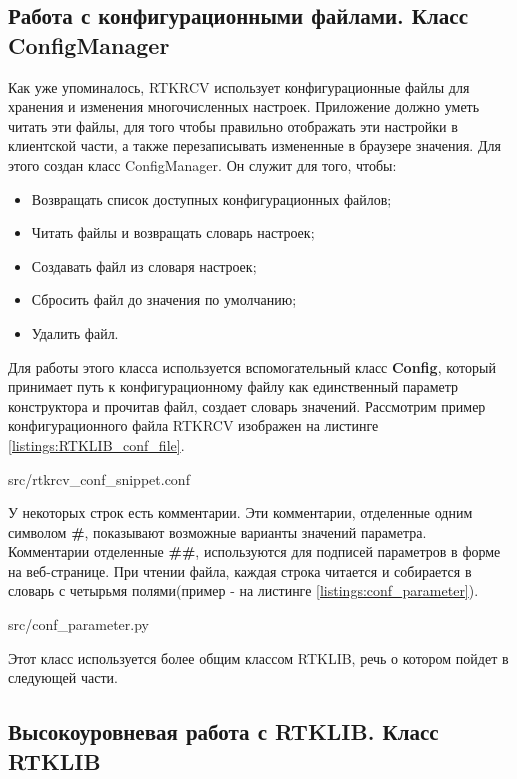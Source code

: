 \subsection{Работа с конфигурационными файлами. Класс ConfigManager} \label{subsect3_1_2}

Как уже упоминалось, RTKRCV использует конфигурационные файлы для хранения и изменения многочисленных настроек. Приложение должно уметь читать эти файлы, для того чтобы правильно отображать эти настройки в клиентской части, а также перезаписывать измененные в браузере значения. Для этого создан класс ConfigManager. Он служит для того, чтобы:

\begin{itemize}
  \item Возвращать список доступных конфигурационных файлов;
  \item Читать файлы и возвращать словарь настроек;
  \item Создавать файл из словаря настроек;
  \item Сбросить файл до значения по умолчанию;
  \item Удалить файл.
\end{itemize}

Для работы этого класса используется вспомогательный класс \textbf{Config}, который принимает путь к конфигурационному файлу как единственный параметр конструктора и прочитав файл, создает словарь значений. Рассмотрим пример конфигурационного файла RTKRCV изображен на листинге \ref{listings:RTKLIB_conf_file}.


{src/rtkrcv_conf_snippet.conf}

У некоторых строк есть комментарии. Эти комментарии, отделенные одним символом \textbf{\#}, показывают возможные варианты значений параметра. Комментарии отделенные \textbf{\#\#}, используются для подписей параметров в форме на веб-странице. При чтении файла, каждая строка читается и собирается в словарь с четырьмя полями(пример - на листинге \ref{listings:conf_parameter}).


{src/conf_parameter.py}

Этот класс используется более общим классом RTKLIB, речь о котором пойдет в следующей части.

\subsection{Высокоуровневая работа с RTKLIB. Класс RTKLIB} \label{subsect3_1_4}

